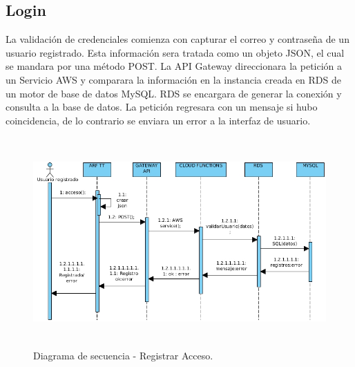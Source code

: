 \subsection{Login}
La validación de credenciales comienza con capturar el correo y contraseña  de un usuario registrado. Esta información sera tratada como un objeto JSON, el cual se mandara por una método POST. La API Gateway direccionara la petición a un Servicio AWS y  comparara la información en la instancia creada en RDS de un motor de base de datos MySQL. RDS se encargara de generar la conexión y consulta a la base de datos. La petición regresara con un mensaje si hubo coincidencia, de lo contrario se enviara un error a la interfaz de usuario.
\begin{figure}[h!]
	\centering
	\includegraphics[width=14cm,height=8cm]{imagenes/analisis/DSacceso.jpg}
	\caption{Diagrama de secuencia - Registrar Acceso.}
	\label{fig:analogo}
\end{figure} 

